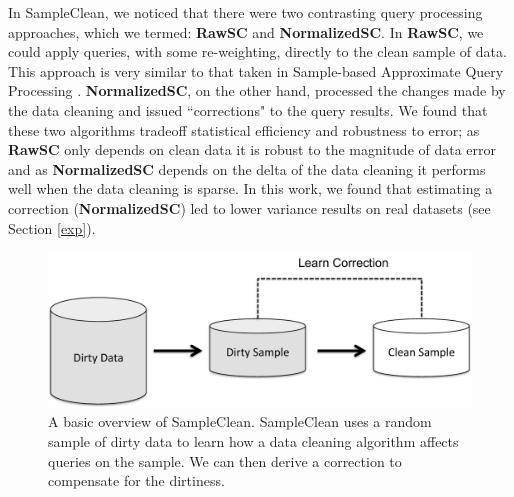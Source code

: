 In SampleClean, we noticed that there were two contrasting query processing approaches, which we termed: \textbf{RawSC}  and \textbf{NormalizedSC}.
In \textbf{RawSC}, we could apply queries, with some re-weighting, directly to the clean sample of data.
This approach is very similar to that taken in Sample-based Approximate Query Processing \cite{OlkenR86,AgarwalMPMMS13, joshi2008materialized}.
\textbf{NormalizedSC}, on the other hand, processed the changes made by the data cleaning and issued ``corrections" to the query results.
We found that these two algorithms tradeoff statistical efficiency and robustness to error; as \textbf{RawSC} only depends on clean data it is robust to the magnitude of data error and as \textbf{NormalizedSC} depends on the delta of the data cleaning it performs well when the data cleaning is sparse. 
In this work, we found that estimating a correction (\textbf{NormalizedSC}) led to lower variance results on real datasets (see Section \ref{exp}). 

\begin{figure}[t] \vspace{-2em}
\centering
 \includegraphics[scale=0.30]{figs/sys-arch2.pdf} \vspace{-.25em}
 \caption{A basic overview of SampleClean. SampleClean uses a random sample of dirty data to learn how a data cleaning algorithm affects queries on the sample. We can then derive a correction to compensate for the dirtiness.  \label{sc} }\vspace{-1.75em}
\end{figure}

